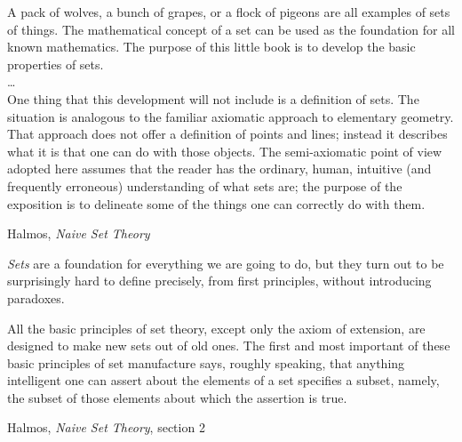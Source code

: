 \setcounter{baseSectionLevel}{\value{currentlevel}}
\epigraph{A pack of wolves, a bunch of grapes, or a flock of
pigeons are all examples of sets of things.
The mathematical concept of a set can be used as the foundation
for all known mathematics.
The purpose of this little book is to develop the basic properties
of sets.\\
\ldots \\
One thing that this development will not include is a definition
of sets.
The situation is analogous to the familiar axiomatic approach to
elementary geometry.
That approach does not offer a definition of points and lines;
instead it describes what it is that one can do with those
objects.
The semi-axiomatic point of view adopted here assumes that the
reader has the ordinary, human, intuitive (and frequently
erroneous) understanding of what sets are; the purpose of the
exposition is to delineate some of the things one can correctly do
with them.}%
{Halmos, \textit{Naive Set Theory}\cite{Halmos1960Naive}}

\vfill

\emph{Sets} are a foundation for everything we are going to do,
but they turn out to be surprisingly hard to define precisely,
from first principles, without introducing paradoxes.

\vfill

\label{sec:math-sets}
\lstset{language=Clojure}

\epigraph{All the basic principles of set theory, except only the
axiom of extension, are designed to make new sets out of old ones.
The first and most important of these basic principles of set
manufacture says, roughly speaking, that anything intelligent one
can assert about the elements of a set specifies a subset, namely,
the subset of those elements about which the assertion is true.}
{Halmos,
\textit{Naive Set Theory}, section 2~\cite{Halmos1960Naive}}

